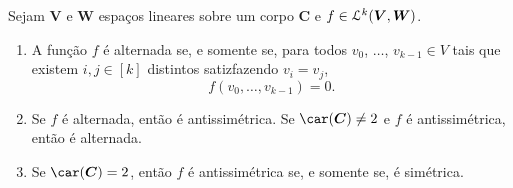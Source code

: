 \begin{prop}
Sejam $\bm V$ e $\bm W$ espaços lineares sobre um corpo $\bm C$ e $f \in \mathcal{L}^k(\bm V,\bm W)$.
	\begin{enumerate}
	\item A função $f$ é alternada se, e somente se, para todos $v_0$, $\ldots$, $v_{k-1} \in V$ tais que existem $i,j \in [k]$ distintos satizfazendo $v_i = v_j$,
	\begin{equation*}
	f(v_0,\ldots,v_{k-1})=0.
	\end{equation*} 
	\item Se $f$ é alternada, então é antissimétrica. Se $\car(\bm C) \neq 2$ e $f$ é antissimétrica, então é alternada.
	\item Se $\car(\bm C) = 2$, então $f$ é antissimétrica se, e somente se, é simétrica.
	\end{enumerate}
\end{prop}
